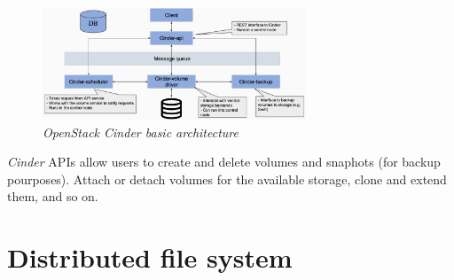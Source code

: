 \begin{figure}[h!]
    \centering
    \includegraphics[width=0.7\textwidth]{images/block-model-cinder.png}
    \caption{\emph{OpenStack Cinder basic architecture}}
\end{figure}

\noindent
\emph{Cinder} APIs allow users to create and delete volumes and snaphots (for
backup pourposes). Attach or detach volumes for the available storage, clone and
extend them, and so on.

\section{Distributed file system}